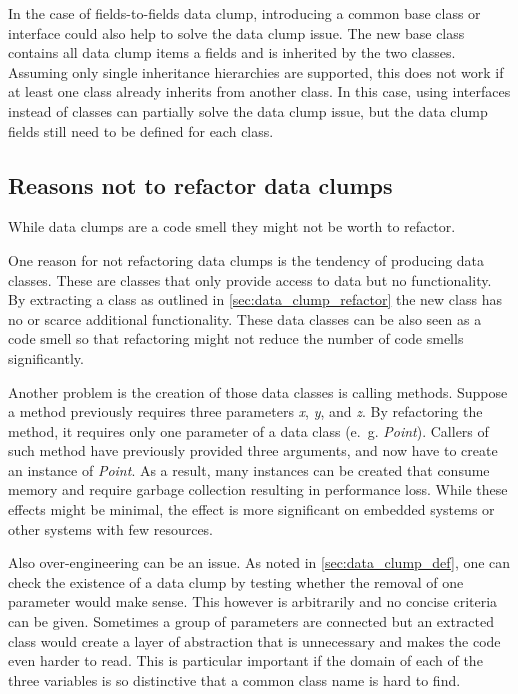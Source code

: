 In the case of fields-to-fields data clump, introducing a common base class or interface could also help to solve the data clump issue. The new base class contains all data clump items a fields and is inherited by the two classes. Assuming only single inheritance hierarchies are supported, this does not work if at least one class already inherits from another class. In this case, using interfaces instead of classes can partially solve the data clump issue, but the data clump fields still need to be defined for each class.





\subsection{Reasons not to refactor data clumps}\label{sec:data_clump_not_refactor}
While data clumps are a code smell they might not be worth to refactor. 

One reason for not refactoring data clumps is the tendency of producing data classes. These are classes that only provide access to data but no functionality. By extracting a class as outlined in \ref{sec:data_clump_refactor} the new class has no or scarce additional functionality. These data classes can be also seen as a code smell so that refactoring might not reduce the number of code smells significantly. 

Another problem is the creation of those data classes is calling methods. Suppose a method previously requires three parameters \textit{x}, \textit{y}, and \textit{z}. By refactoring the method, it requires only one parameter of a data class (e.~g. \textit{Point}). Callers of such method have previously provided three arguments, and now have to create an instance of \textit{Point}. As a result, many instances can be created that consume memory and require garbage collection resulting in performance loss. While these effects might be minimal, the effect is more significant on embedded systems or other systems with few resources. 

Also over-engineering can be an issue. As noted in \ref{sec:data_clump_def}, one can check the existence of a data clump by testing whether the removal of one parameter would make sense. This however is arbitrarily and no concise criteria can be given. Sometimes a group of parameters are connected but an extracted class would create a layer of abstraction that is unnecessary and makes the code even harder to read. This is particular important if the domain of each of the three variables is so distinctive that a common class name is hard to find.

